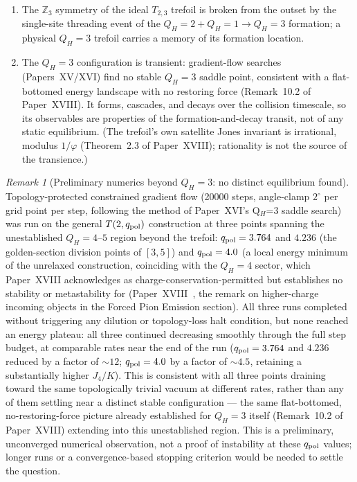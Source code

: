 \documentclass[11pt,a4paper]{article}
\theoremstyle{definition}\newtheorem{definition}[theorem]{Definition}
\theoremstyle{remark}
\newtheorem{remark}[theorem]{Remark}
\newcommand{\vp}{\varphi}
\newcommand{\QH}{Q_H}
\newcommand{\Zthree}{\mathbb{Z}_3}
\begin{document}
\begin{enumerate}[label=(\arabic*)]
\item The $\Zthree$ symmetry of the ideal $T_{2,3}$ trefoil is
broken from the outset by the single-site threading event of the
$\QH=2+\QH=1\to \QH=3$ formation; a physical $\QH=3$ trefoil
carries a memory of its formation location.

\item The $\QH=3$ configuration is transient: gradient-flow searches
(Papers~XV/XVI) find no stable $\QH=3$ saddle point, consistent with
a flat-bottomed energy landscape with no restoring force (Remark~10.2
of Paper~XVIII). %
It forms, cascades, and decays over the collision timescale, so its
observables are properties of the formation-and-decay transit, not of
any static equilibrium.  (The trefoil's own satellite Jones invariant
is irrational, modulus $1/\vp$ (Theorem~2.3 of Paper~XVIII); %
rationality is not the source of the transience.)
\end{enumerate}

\begin{remark}[Preliminary numerics beyond $\QH=3$: no distinct equilibrium found]
\label{P19:rem:beyond_qh3_numerics}
Topology-protected constrained gradient flow (20000 steps, angle-clamp
$2^\circ$ per grid point per step, following the method of
Paper~XVI's Q$_H$=3 saddle search) was run on the general $T(2,q_{\rm pol})$
construction at three points spanning the unestablished $\QH=4$--$5$
region beyond the trefoil: $q_{\rm pol}=3.764$ and $4.236$ (the
golden-section division points of $[3,5]$) and $q_{\rm pol}=4.0$ (a
local energy minimum of the unrelaxed construction, coinciding with
the $\QH=4$ sector, which Paper~XVIII acknowledges as charge-conservation-permitted
but establishes no stability or metastability for
(Paper~XVIII~\cite{Paper18}, the remark on higher-charge incoming objects
in the Forced Pion Emission section). %
All three runs completed without triggering any dilution or
topology-loss halt condition, but none reached an energy plateau:
all three continued decreasing smoothly through the full step budget,
at comparable rates near the end of the run ($q_{\rm pol}=3.764$ and
$4.236$ reduced by a factor of $\sim12$; $q_{\rm pol}=4.0$ by a factor
of $\sim4.5$, retaining a substantially higher $J_4/K$).  This is
consistent with all three points draining toward the same
topologically trivial vacuum at different rates, rather than any of
them settling near a distinct stable configuration --- the same
flat-bottomed, no-restoring-force picture already established for
$\QH=3$ itself (Remark~10.2 of Paper~XVIII) %
extending into this unestablished region.  This is a preliminary,
unconverged numerical observation, not a proof of instability at
these $q_{\rm pol}$ values; longer runs or a convergence-based
stopping criterion would be needed to settle the question.
\end{remark}
\end{document}
